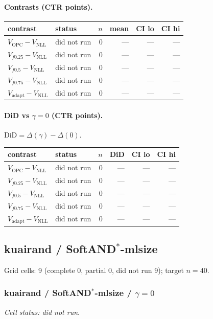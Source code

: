 \documentclass[10pt,a4paper]{article}
\begin{document}
\paragraph{Contrasts (CTR points).}
{\centering\small\begin{tabular}{llrrrr}
\toprule contrast & status & $n$ & mean & CI lo & CI hi \\
\midrule
$V_{\mathrm{OPC}}-V_{\mathrm{NLL}}$ & did not run & 0 & --- & --- & --- \\
$V_{f0.25}-V_{\mathrm{NLL}}$ & did not run & 0 & --- & --- & --- \\
$V_{f0.5}-V_{\mathrm{NLL}}$ & did not run & 0 & --- & --- & --- \\
$V_{f0.75}-V_{\mathrm{NLL}}$ & did not run & 0 & --- & --- & --- \\
$V_{\mathrm{adapt}}-V_{\mathrm{NLL}}$ & did not run & 0 & --- & --- & --- \\
\bottomrule\end{tabular}\par}
\paragraph{DiD vs $\gamma=0$ (CTR points).} $\mathrm{DiD}=\Delta(\gamma)-\Delta(0)$.
{\centering\small\begin{tabular}{llrrrr}
\toprule contrast & status & $n$ & DiD & CI lo & CI hi \\
\midrule
$V_{\mathrm{OPC}}-V_{\mathrm{NLL}}$ & did not run & 0 & --- & --- & --- \\
$V_{f0.25}-V_{\mathrm{NLL}}$ & did not run & 0 & --- & --- & --- \\
$V_{f0.5}-V_{\mathrm{NLL}}$ & did not run & 0 & --- & --- & --- \\
$V_{f0.75}-V_{\mathrm{NLL}}$ & did not run & 0 & --- & --- & --- \\
$V_{\mathrm{adapt}}-V_{\mathrm{NLL}}$ & did not run & 0 & --- & --- & --- \\
\bottomrule\end{tabular}\par}
\bigskip
\newpage
\subsection{kuairand / SoftAND$^*$-mlsize}
Grid cells: 9 (complete 0, partial 0, did not run 9); target $n=40$.
\subsubsection{kuairand / SoftAND$^*$-mlsize / $\gamma=0$}
\emph{Cell status: did not run}.
\end{document}
